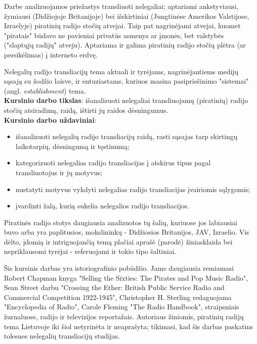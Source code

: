 \documentclass[kursinis-darbas]{vukf}
\begin{document}
Darbe analizuojamos priežastys transliuoti nelegaliai; aptariami ankstyviausi, žymiausi (Didžiojoje Britanijoje) bei išskirtiniai (Jungtinėse Amerikos Valstijose, Izraelyje) piratinių radijo stočių atvejai. Taip pat nagrinėjami atvejai, kuomet "piratais" būdavo ne pavieniai privatūs asmenys ar įmonės, bet valstybės ("slaptųjų radijų" atveju). Aptariama ir galima piratinių radijo stočių plėtra (ar persikėlimas) į interneto erdvę.

Nelegalių radijo transliacijų tema aktuali ir tyrėjams, nagrinėjantiems medijų sąsają su žodžio laisve, ir entuziastams, kuriuos masina pasipriešinimo "sistemai" (angl. \emph{establishment}) tema.\\

\textbf{Kursinio darbo tikslas}: išanalizuoti nelegaliai transliuojamų (piratinių) radijo stočių atsiradimą, raidą, ištirti jų raidos dėsningumus.\\

\textbf{Kursinio darbo uždaviniai}:

\begin{itemize}
	\item išanalizuoti nelegalių radijo transliacijų raidą, rasti sąsajas tarp skirtingų laikotarpių, dėsningumą ir tęstinumą;
	\item kategorizuoti nelegalias radijo transliacijas į atskirus tipus pagal transliuotojus ir jų motyvus;
	\item nustatyti motyvus vykdyti nelegalias radijo transliacijas įvairiomis sąlygomis;
	\item įvardinti žalą, kurią sukelia nelegalios radijo transliacijos.
\end{itemize}

Piratinės radijo stotys daugiausia analizuotos tų šalių, kuriuose jos labiausiai buvo arba yra paplitusios, mokslininkų - Didžiosios Britanijos, JAV, Izraelio. Vis dėlto, įdomią ir intriguojančią temą plačiai aprašė (parodė) žiniasklaida bei nepriklausomi tyrėjai - referuojami ir tokio tipo šaltiniai.

Šis kursinis darbas yra istoriografinio pobūdžio. Jame daugiausia remiamasi Robert Chapman knyga "Selling the Sixties: The Pirates and Pop Music Radio", Sean Street darbu "Crossing the Ether: British Public Service Radio and Commercial Competition 1922-1945", Christopher H. Sterling redaguojama "Encyclopedia of Radio", Carole Fleming "The Radio Handbook", straipsniais žurnaluose, radijo ir televizijos reportažais. Autoriaus žiniomis, piratinių radijų tema Lietuvoje iki šiol netyrinėta ir neaprašyta; tikimasi, kad šis darbas paskatins tolesnes nelegalių transliacijų studijas.
\end{document}

